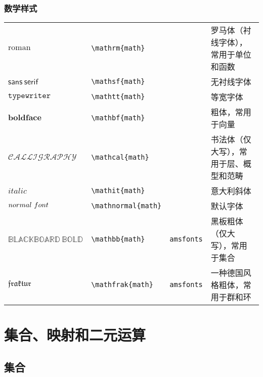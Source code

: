 \subsection{数学样式}
%
\begin{table}[h]
	\centering
	\begin{tabular}{l l l l}
		\hline
		$\mathrm{roman}$            & \verb|\mathrm{|{\color{gray}\verb|math|}\verb|}|     &                 & 罗马体（衬线字体），常用于单位和函数 \\
		$\mathsf{sans\ serif}$      & \verb|\mathsf{|{\color{gray}\verb|math|}\verb|}|     &                 & 无衬线字体 \\
		$\mathtt{typewriter}$       & \verb|\mathtt{|{\color{gray}\verb|math|}\verb|}|     &                 & 等宽字体 \\
		$\mathbf{bold face}$        & \verb|\mathbf{|{\color{gray}\verb|math|}\verb|}|     &                 & 粗体，常用于向量 \\
		$\mathcal{CALLIGRAPHY}$     & \verb|\mathcal{|{\color{gray}\verb|math|}\verb|}|    &                 & 书法体（仅大写），常用于层、概型和范畴 \\
		$\mathit{italic}$           & \verb|\mathit{|{\color{gray}\verb|math|}\verb|}|     &                 & 意大利斜体 \\
		$\mathnormal{normal\ font}$ & \verb|\mathnormal{|{\color{gray}\verb|math|}\verb|}| &                 & 默认字体 \\
		\hline
		$\mathbb{BLACKBOARD\ BOLD}$ & \verb|\mathbb{|{\color{gray}\verb|math|}\verb|}|     & \verb|amsfonts| & 黑板粗体（仅大写），常用于集合 \\
		$\mathfrak{fraktur}$        & \verb|\mathfrak{|{\color{gray}\verb|math|}\verb|}|   & \verb|amsfonts| & 一种德国风格粗体，常用于群和环 \\
		\hline
	\end{tabular}
\end{table}
%

\chapter{集合、映射和二元运算}

\section{集合}

